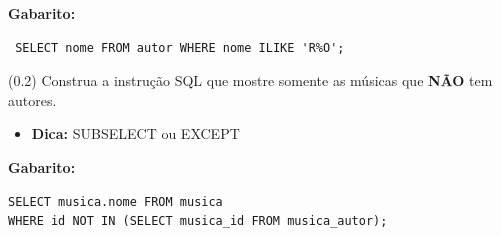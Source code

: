 \documentclass[12pt]{exam}
\begin{document}
\begin{questions}
\textbf{Gabarito:}
\begin{verbatim}
 SELECT nome FROM autor WHERE nome ILIKE 'R%O';
\end{verbatim}







\question (0.2)  Construa a instrução SQL que mostre somente as músicas que \textbf{NÃO} tem autores.

\begin{itemize}
    \item \textbf{Dica:} SUBSELECT ou EXCEPT
\end{itemize}

\textbf{Gabarito:}
\begin{verbatim}
SELECT musica.nome FROM musica 
WHERE id NOT IN (SELECT musica_id FROM musica_autor);
\end{verbatim}



\end{questions}
\end{document}
